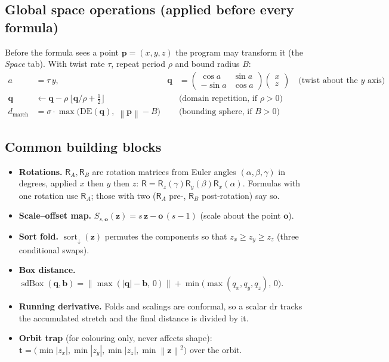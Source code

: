 \documentclass[10pt,a4paper]{article}
\newcommand{\vv}[1]{\mathbf{#1}}
\newcommand{\abs}[1]{\left|#1\right|}
\newcommand{\norm}[1]{\left\lVert#1\right\rVert}
\newcommand{\sdbox}{\operatorname{sdBox}}
\newcommand{\sortd}{\operatorname{sort}_{\downarrow}}
\newcommand{\Rot}{\mathsf{R}}
\newcommand{\DE}{\mathrm{DE}}
\begin{document}
\subsection{Global space operations (applied before every formula)}
Before the formula sees a point $\vv p=(x,y,z)$ the program may transform it (the \emph{Space} tab). With twist rate $\tau$, repeat period $\rho$ and bound radius $B$:
\begin{align}
a &= \tau\,y, & \vv q&=\begin{pmatrix}\cos a & \sin a\\ -\sin a&\cos a\end{pmatrix}\!\begin{pmatrix}x\\z\end{pmatrix}\quad\text{(twist about the $y$ axis)}\\
\vv q &\leftarrow \vv q-\rho\,\lfloor \vv q/\rho+\tfrac12\rfloor &&\text{(domain repetition, if $\rho>0$)}\\
d_{\text{march}} &= \sigma\cdot\max\!\big(\DE(\vv q),\;\norm{\vv p}-B\big) &&\text{(bounding sphere, if $B>0$)}
\end{align}

\subsection{Common building blocks}
\begin{itemize}
\item \textbf{Rotations.} $\Rot_A,\Rot_B$ are rotation matrices from Euler angles $(\alpha,\beta,\gamma)$ in degrees, applied $x$ then $y$ then $z$: $\Rot=\Rot_z(\gamma)\Rot_y(\beta)\Rot_x(\alpha)$.
Formulas with one rotation use $\Rot_A$; those with two ($\Rot_A$ pre-, $\Rot_B$ post-rotation) say so.
\item \textbf{Scale--offset map.} $S_{s,\vv o}(\vv z)=s\,\vv z-\vv o\,(s-1)$ (scale about the point $\vv o$).
\item \textbf{Sort fold.} $\sortd(\vv z)$ permutes the components so that $z_x\ge z_y\ge z_z$ (three conditional swaps).
\item \textbf{Box distance.} $\sdbox(\vv q,\vv b)=\norm{\max(\abs{\vv q}-\vv b,\,0)}+\min\!\big(\max(q_x,q_y,q_z),\,0\big)$.
\item \textbf{Running derivative.} Folds and scalings are conformal, so a scalar $\mathrm{dr}$ tracks the accumulated stretch and the final distance is divided by it.
\item \textbf{Orbit trap} (for colouring only, never affects shape): $\vv t=\big(\min\abs{z_x},\min\abs{z_y},\min\abs{z_z},\min\norm{\vv z}^2\big)$ over the orbit.
\end{itemize}
\end{document}
